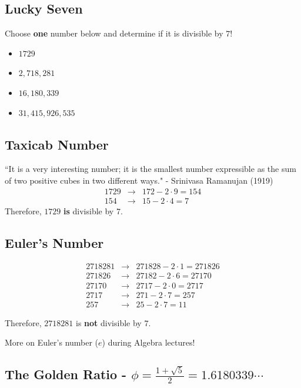\subsection*{Lucky Seven}

Choose \textbf{one} number below and determine if it is divisible by $7$!
\begin{itemize}
	\item $1729$
	\item $2,718,281$
	\item $16,180,339$
	\item $31,415,926,535$
\end{itemize}

\subsection*{Taxicab Number}

``It is a very interesting number; it is the smallest number expressible as the sum of two positive cubes in two different ways." -  Srinivasa Ramanujan (1919)
\begin{eqnarray*}
	1729 &\to& 172-2\cdot 9=154 \\ 
	154 &\to& 15-2\cdot 4=7
\end{eqnarray*}
Therefore, $1729$ \textbf{is} divisible by $7$.


\clearpage

\subsection*{Euler's Number}

\begin{eqnarray*}  
	2718281 &\to& 271828-2\cdot 1=271826 \\ 
	271826 &\to& 27182-2\cdot 6=27170 \\
	27170 &\to& 2717-2\cdot 0=2717 \\ 2717 &\to& 271-2\cdot 7=257 \\ 257 &\to& 25-2\cdot 7=11
\end{eqnarray*}

Therefore, $2718281$ is \textbf{not} divisible by $7$.

More on Euler's number ($e$) during Algebra lectures!  

\clearpage

\subsection*{The Golden Ratio - $\phi=\frac{1+\sqrt{5}}{2}=1.6180339\cdots$}

